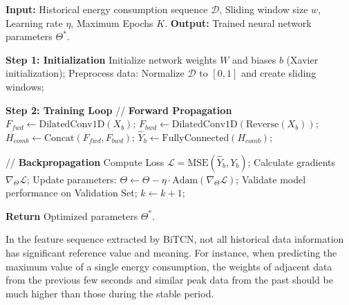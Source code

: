 \documentclass[conference]{{IEEEtran}}
\begin{document}
\begin{algorithm}[!t] 
\caption{Training Process of the BiTCN Energy Consumption Prediction Model}
\label{alg:bitcn_training}
\begin{algorithmic}[1]
\State \textbf{Input:} Historical energy consumption sequence $\mathcal{D}$, Sliding window size $w$, Learning rate $\eta$, Maximum Epochs $K$.
\State \textbf{Output:} Trained neural network parameters $\Theta^*$.

\State \textbf{Step 1: Initialization}
\State Initialize network weights $W$ and biases $b$ (Xavier initialization);
\State Preprocess data: Normalize $\mathcal{D}$ to $[0, 1]$ and create sliding windows;

\State \textbf{Step 2: Training Loop}
        \State // \textbf{Forward Propagation}
        \State $F_{fwd} \leftarrow \text{DilatedConv1D}(X_b)$; 
        \State $F_{bwd} \leftarrow \text{DilatedConv1D}(\text{Reverse}(X_b))$; 
        \State $H_{comb} \leftarrow \text{Concat}(F_{fwd}, F_{bwd})$; 
        \State $\hat{Y}_b \leftarrow \text{FullyConnected}(H_{comb})$;
        
        \State // \textbf{Backpropagation}
        \State Compute Loss $\mathcal{L} = \text{MSE}(\hat{Y}_b, Y_b)$;
        \State Calculate gradients $\nabla_\Theta \mathcal{L}$;
        \State Update parameters: $\Theta \leftarrow \Theta - \eta \cdot \text{Adam}(\nabla_\Theta \mathcal{L})$;
    \EndFor
    \State Validate model performance on Validation Set;
    \State $k \leftarrow k + 1$;
\EndWhile

\State \textbf{Return} Optimized parameters $\Theta^*$.
\end{algorithmic}
\end{algorithm}

In the feature sequence extracted by BiTCN, not all historical data information has significant reference value and meaning\cite{song2024predicting}. For instance, when predicting the maximum value of a single energy consumption, the weights of adjacent data from the previous few seconds and similar peak data from the past should be much higher than those during the stable period\cite{bi2023network}.
\end{document}
